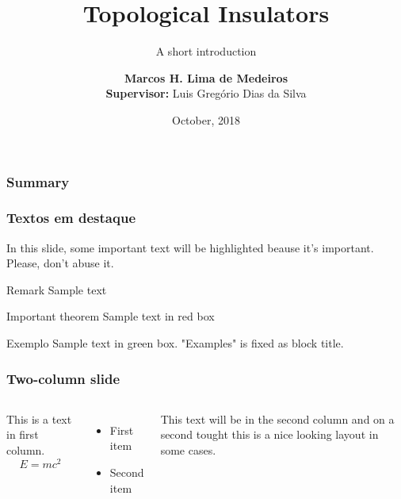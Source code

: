 \documentclass[usenames, dvipsnames]{beamer}
\title[introduction to topological insulators] %
{Topological Insulators}
\subtitle{A short introduction}
\author[My name]{\textbf {Marcos H. Lima de Medeiros}\\ \textbf{\footnotesize Supervisor:} \footnotesize Luis Gregório Dias da Silva }
\institute[VFU] %
{
  Instituto de Física\\
  Universidade de São Paulo
}
\date[VLC 2013] %
{October, 2018}
\begin{document}
\frame{\titlepage}

\begin{frame}
 \frametitle{Summary}
 \tableofcontents[pausesections]
\end{frame}


\begin{frame}
\frametitle{Textos em destaque}

In this slide, some important text will be
\alert{highlighted} beause it's important.
Please, don't abuse it.

\begin{block}{Remark}
Sample text
\end{block}

\begin{alertblock}{Important theorem}
Sample text in red box
\end{alertblock}

\begin{examples}{Exemplo}
Sample text in green box. "Examples" is fixed as block title.
\end{examples}

\end{frame}


\begin{frame}
\frametitle{Two-column slide}

\begin{columns}

This is a text in first column.
$$ E= mc^2 $$
\begin{itemize}
\item First item
\item Second item
\end{itemize}

This text will be in the second column
and on a second tought this is a nice looking
layout in some cases.
\end{columns}
\end{frame}
\end{document}
